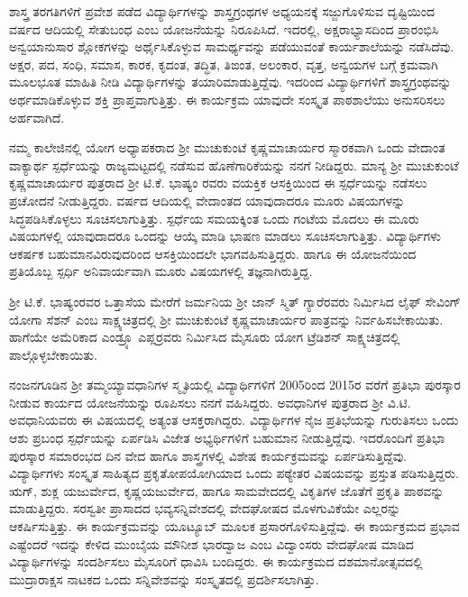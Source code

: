 ಶಾಸ್ತ್ರ ತರಗತಿಗಳಿಗೆ ಪ್ರವೇಶ ಪಡೆದ ವಿದ್ಯಾರ್ಥಿಗಳನ್ನು ಶಾಸ್ತ್ರಗ್ರಂಥಗಳ ಅಧ್ಯಯನಕ್ಕೆ ಸಜ್ಜುಗೊಳಿಸುವ ದೃಷ್ಟಿಯಿಂದ ವರ್ಷದ ಆದಿಯಲ್ಲಿ ಸೇತುಬಂಧ ಎಂಬ ಯೋಜನೆಯನ್ನು ನಿರೂಪಿಸಿದೆ.  ಇದರಲ್ಲಿ, ಅಕ್ಷರಾಭ್ಯಾಸದಿಂದ ಪ್ರಾರಂಭಿಸಿ ಅನ್ವಯಾನುಸಾರ ಶ್ಲೋಕಗಳನ್ನು ಅರ್ಥೈಸಿಕೊಳ್ಳುವ ಸಾಮರ್ಥ್ಯವನ್ನು ಪಡೆಯುವಂತೆ ಕಾರ್ಯಶಾಲೆಯನ್ನು ನಡೆಸಿದೆವು.  ಅಕ್ಷರ, ಪದ, ಸಂಧಿ, ಸಮಾಸ, ಕಾರಕ, ಕೃದಂತ, ತದ್ಧಿತ, ತಿಙಂತ, ಅಲಂಕಾರ, ವೃತ್ತ, ಅನ್ವಯಗಳ ಬಗ್ಗೆ ಕ್ರಮವಾಗಿ ಮೂಲಭೂತ ಮಾಹಿತಿ ನೀಡಿ ವಿದ್ಯಾರ್ಥಿಗಳನ್ನು ತಯಾರಿಮಾಡುತ್ತಿದ್ದೆವು. ಇದರಿಂದ ವಿದ್ಯಾರ್ಥಿಗಳಿಗೆ ಶಾಸ್ತ್ರಗ್ರಂಥವನ್ನು ಅರ್ಥಮಾಡಿಕೊಳ್ಳುವ ಶಕ್ತಿ ಪ್ರಾಪ್ತವಾಗುತ್ತಿತ್ತು.  ಈ ಕಾರ್ಯಕ್ರಮ ಯಾವುದೇ ಸಂಸ್ಕೃತ ಪಾಠಶಾಲೆಯು ಅನುಸರಿಸಲು ಅರ್ಹವಾಗಿದೆ.  

ನಮ್ಮ ಕಾಲೇಜಿನಲ್ಲಿ ಯೋಗ ಅಧ್ಯಾಪಕರಾದ ಶ್ರೀ ಮುಚುಕುಂಟೆ ಕೃಷ್ಣಮಾಚಾರ್ಯರ ಸ್ಮಾರಕವಾಗಿ ಒಂದು ವೇದಾಂತ ವಾಕ್ಯಾರ್ಥ ಸ್ಪರ್ಧೆಯನ್ನು ರಾಜ್ಯಮಟ್ಟದಲ್ಲಿ ನಡೆಸುವ ಹೊಣೆಗಾರಿಕೆಯನ್ನು ನನಗೆ ನೀಡಿದ್ದರು.  ಮಾನ್ಯ ಶ್ರೀ ಮುಚುಕುಂಟೆ ಕೃಷ್ಣಮಾಚಾರ್ಯರ ಪುತ್ರರಾದ ಶ್ರೀ ಟಿ.ಕೆ. ಭಾಷ್ಯಂ ರವರು ವಯಕ್ತಿಕ ಆಸಕ್ತಿಯಿಂದ ಈ ಸ್ಪರ್ಧೆಯನ್ನು ನಡೆಸಲು ಪ್ರಚೋದನೆ ನೀಡುತ್ತಿದ್ದರು.  ವರ್ಷದ ಆದಿಯಲ್ಲಿ ವೇದಾಂತದ ಯಾವುದಾದರೂ ಮೂರು ವಿಷಯಗಳನ್ನು ಸಿದ್ಧಪಡಿಸಿಕೊಳ್ಳಲು ಸೂಚಿಸಲಾಗುತ್ತಿತ್ತು.   ಸ್ಪರ್ಧೆಯ ಸಮಯಕ್ಕಿಂತ ಒಂದು ಗಂಟೆಯ ಮೊದಲು ಈ ಮೂರು ವಿಷಯಗಳಲ್ಲಿ ಯಾವುದಾದರೂ ಒಂದನ್ನು ಆಯ್ಕೆ ಮಾಡಿ ಭಾಷಣ ಮಾಡಲು ಸೂಚಿಸಲಾಗುತ್ತಿತ್ತು.  ವಿದ್ಯಾರ್ಥಿಗಳು ಆಕರ್ಷಕ ಬಹುಮಾನವಿರುವುದರಿಂದ ಆಸಕ್ತಿಯಿಂದಲೇ ಭಾಗವಹಿಸುತ್ತಿದ್ದರು.  ಹಾಗೂ ಈ ಯೋಜನೆಯಿಂದ ಪ್ರತಿಯೊಬ್ಬ ಸ್ಪರ್ಧಿ ಅನಿವಾರ್ಯವಾಗಿ ಮೂರು ವಿಷಯಗಳಲ್ಲಿ ತಜ್ಞನಾಗಿರುತ್ತಿದ್ದ.  

ಶ್ರೀ ಟಿ.ಕೆ. ಭಾಷ್ಯಂರವರ ಒತ್ತಾಸೆಯ ಮೇರೆಗೆ ಜರ್ಮನಿಯ ಶ್ರೀ ಜಾನ್ ಸ್ಮಿತ್ ಗ್ಯಾರೆರವರು ನಿರ್ಮಿಸಿದ ಲೈಫ್ ಸೇವಿಂಗ್ ಯೋಗಾ ಸೆಶನ್ ಎಂಬ ಸಾಕ್ಷ್ಯಚಿತ್ರದಲ್ಲಿ ಶ್ರೀ ಮುಚುಕುಂಟೆ ಕೃಷ್ಣಮಾಚಾರ್ಯರ ಪಾತ್ರವನ್ನು ನಿರ್ವಹಿಸಬೇಕಾಯಿತು.  ಹಾಗೆಯೇ ಅಮೆರಿಕಾದ ಎಂಡ್ರ್ಯೂ ಎಪ್ಲರ್‍ರವರು ನಿರ್ಮಿಸಿದ ಮೈಸೂರು ಯೋಗ ಟ್ರೆಡಿಶನ್  ಸಾಕ್ಷ್ಯಚಿತ್ರದಲ್ಲಿ ಪಾಲ್ಗೊಳ್ಳಬೇಕಾಯಿತು. 

ನಂಜನಗೂಡಿನ ಶ್ರೀ ತಮ್ಮಯ್ಯಾವಧಾನಿಗಳ ಸ್ಮೃತಿಯಲ್ಲಿ ವಿದ್ಯಾರ್ಥಿಗಳಿಗೆ 2005ರಿಂದ 2015ರ ವರೆಗೆ ಪ್ರತಿಭಾ ಪುರಸ್ಕಾರ ನೀಡುವ ಕಾರ್ಯದ ಯೋಜನೆಯನ್ನು ರೂಪಿಸಲು ನನಗೆ ವಹಿಸಿದ್ದರು.  ಅವಧಾನಿಗಳ ಪುತ್ರರಾದ ಶ್ರೀ ವಿ.ಟಿ. ಅವಧಾನಿಯವರು ಈ ವಿಷಯದಲ್ಲಿ ಅತ್ಯಂತ ಆಸಕ್ತರಾಗಿದ್ದರು.  ವಿದ್ಯಾರ್ಥಿಗಳ ನೈಜ ಪ್ರತಿಭೆಯನ್ನು ಗುರುತಿಸಲು ಒಂದು ಆಶು ಪ್ರಬಂಧ ಸ್ಪರ್ಧೆಯನ್ನು ಏರ್ಪಡಿಸಿ ವಿಜೇತ ಅಭ್ಯರ್ಥಿಗಳಿಗೆ ಬಹುಮಾನ ನೀಡುತ್ತಿದ್ದೆವು.  ಇದರೊಂದಿಗೆ ಪ್ರತಿಭಾ ಪುರಸ್ಕಾರ ಸಮಾರಂಭದ ದಿನ ವೇದ ಹಾಗೂ ಶಾಸ್ತ್ರಗಳಲ್ಲಿ ವಿಶೇಷ ಕಾರ್ಯಕ್ರಮವನ್ನು ಏರ್ಪಡಿಸುತ್ತಿದ್ದೆವು.  ವಿದ್ಯಾರ್ಥಿಗಳು ಸಂಸ್ಕೃತ ಸಾಹಿತ್ಯದ ಪ್ರಕೃತೋಪಯೋಗಿಯಾದ ಒಂದು ಪಠ್ಯೇತರ ವಿಷಯವನ್ನು ಪ್ರಸ್ತುತ ಪಡಿಸುತ್ತಿದ್ದರು.  ಋಗ್, ಶುಕ್ಲ ಯಜುರ್ವೇದ, ಕೃಷ್ಣಯಜುರ್ವೇದ, ಹಾಗೂ ಸಾಮವೇದದಲ್ಲಿ ವಿಕೃತಿಗಳ ಜೊತೆಗೆ ಪ್ರಕೃತಿ ಪಾಠವನ್ನು ಮಾಡುತ್ತಿದ್ದರು.  ಸರಸ್ವತೀ ಪ್ರಾಸಾದದ ಭವ್ಯಸನ್ನಿವೇಶದಲ್ಲಿ ವೇದಘೋಷದ ಮೊಳಗುವಿಕೆಯೇ ಎಲ್ಲರನ್ನು ಆಕರ್ಷಿಸುತ್ತಿತ್ತು.  ಈ ಕಾರ್ಯಕ್ರಮವನ್ನು ಯೂಟ್ಯೂಬ್ ಮೂಲಕ ಪ್ರಸಾರಗೊಳಿಸುತ್ತಿದ್ದೆವು.  ಈ ಕಾರ್ಯಕ್ರಮದ ಪ್ರಭಾವ ಎಷ್ಟೆಂದರೆ ಇದನ್ನು ಕೇಳಿದ ಮುಂಬೈಯ ಮೌನೀಶ ಭಾರದ್ವಾಜ ಎಂಬ ವಿದ್ವಾಂಸರು ವೇದಘೋಷ ಮಾಡಿದ ವಿದ್ಯಾರ್ಥಿಗಳನ್ನು ಸಂದರ್ಶಿಸಲು ಮೈಸೂರಿಗೆ ಧಾವಿಸಿ ಬಂದಿದ್ದರು.  ಈ ಕಾರ್ಯಕ್ರಮದ ದಶಮಾನೋತ್ಸವದಲ್ಲಿ  ಮುದ್ರಾರಾಕ್ಷಸ ನಾಟಕದ ಒಂದು ಸನ್ನಿವೇಶವನ್ನು ಸಂಸ್ಕೃತದಲ್ಲಿ ಪ್ರದರ್ಶಿಸಲಾಗಿತ್ತು. 

